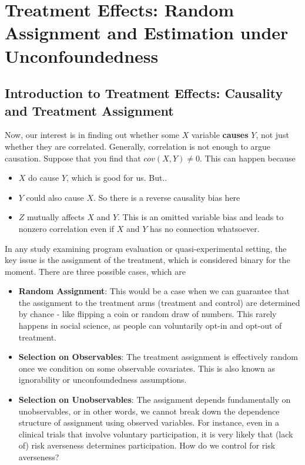 
\chapter{Treatment Effects: Random Assignment and Estimation under Unconfoundedness}
\section{Introduction to Treatment Effects: Causality and Treatment Assignment}
Now, our interest is in finding out whether some $X$ variable \textbf{causes} $Y$, not just whether they are correlated. Generally, correlation is not enough to argue causation. Suppose that you find that $cov(X,Y)\neq0$. This can happen because
\begin{itemize}
\item $X$ do cause $Y$, which is good for us. But..
\item $Y$ could also cause $X$. So there is a reverse causality bias here
\item $Z$ mutually affects $X$ and $Y$. This is an omitted variable bias and leads to nonzero correlation even if $X$ and $Y$ has no connection whatsoever. 
\end{itemize} \par
In any study examining program evaluation or quasi-experimental setting, the key issue is the assignment of the treatment, which is considered binary for the moment. There are three possible cases, which are
\begin{itemize}
\item \textbf{Random Assignment}: This would be a case when we can guarantee that the assignment to the treatment arms (treatment and control) are determined by chance - like flipping a coin or random draw of numbers. This rarely happens in social science, as people can voluntarily opt-in and opt-out of treatment. 
\item \textbf{Selection on Observables}: The treatment assignment is effectively random once we condition on some observable covariates. This is also known as ignorability or unconfoundedness assumptions.
\item \textbf{Selection on Unobservables}: The assignment depends fundamentally on unobservables, or in other words, we cannot break down the dependence structure of assignment using observed variables. For instance, even in a clinical trials that involve voluntary participation, it is very likely that (lack of) risk averseness determines participation. How do we control for risk averseness?
\end{itemize}
